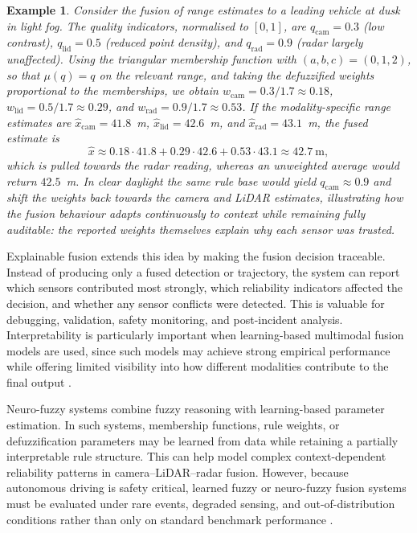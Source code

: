 \documentclass[11pt,oneside,openany]{book}
\newtheorem{example}{Example}[chapter]
\begin{document}
{\color{RevisionOlive}
\begin{example}
Consider the fusion of range estimates to a leading vehicle at dusk in light fog. The quality indicators, normalised to $[0,1]$, are $q_{\mathrm{cam}}=0.3$ (low contrast), $q_{\mathrm{lid}}=0.5$ (reduced point density), and $q_{\mathrm{rad}}=0.9$ (radar largely unaffected). Using the triangular membership function with $(a,b,c)=(0,1,2)$, so that $\mu(q)=q$ on the relevant range, and taking the defuzzified weights proportional to the memberships, we obtain $w_{\mathrm{cam}}=0.3/1.7\approx0.18$, $w_{\mathrm{lid}}=0.5/1.7\approx0.29$, and $w_{\mathrm{rad}}=0.9/1.7\approx0.53$. If the modality-specific range estimates are $\hat{x}_{\mathrm{cam}}=41.8$~m, $\hat{x}_{\mathrm{lid}}=42.6$~m, and $\hat{x}_{\mathrm{rad}}=43.1$~m, the fused estimate is
\begin{equation*}
\hat{x} \approx 0.18\cdot41.8 + 0.29\cdot42.6 + 0.53\cdot43.1 \approx 42.7~\mathrm{m},
\end{equation*}
which is pulled towards the radar reading, whereas an unweighted average would return $42.5$~m. In clear daylight the same rule base would yield $q_{\mathrm{cam}}\approx0.9$ and shift the weights back towards the camera and LiDAR estimates, illustrating how the fusion behaviour adapts continuously to context while remaining fully auditable: the reported weights themselves explain why each sensor was trusted.
\end{example}
}

Explainable fusion extends this idea by making the fusion decision traceable. Instead of producing only a fused detection or trajectory, the system can report which sensors contributed most strongly, which reliability indicators affected the decision, and whether any sensor conflicts were detected. This is valuable for debugging, validation, safety monitoring, and post-incident analysis. Interpretability is particularly important when learning-based multimodal fusion models are used, since such models may achieve strong empirical performance while offering limited visibility into how different modalities contribute to the final output \cite{baltrusaitis_multimodal_2019}.

Neuro-fuzzy systems combine fuzzy reasoning with learning-based parameter estimation. In such systems, membership functions, rule weights, or defuzzification parameters may be learned from data while retaining a partially interpretable rule structure. This can help model complex context-dependent reliability patterns in camera--LiDAR--radar fusion. However, because autonomous driving is safety critical, learned fuzzy or neuro-fuzzy fusion systems must be evaluated under rare events, degraded sensing, and out-of-distribution conditions rather than only on standard benchmark performance \cite{khaleghi_multisensor_2013, baltrusaitis_multimodal_2019}.
\end{document}
